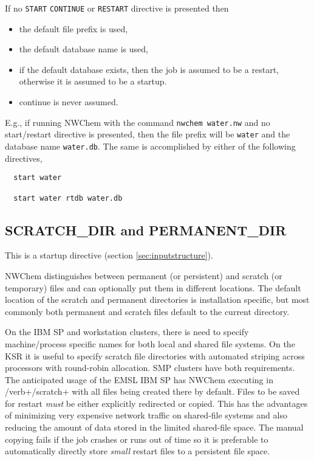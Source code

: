 If no \verb+START+ \verb+CONTINUE+ or \verb+RESTART+ directive is
presented then 
\begin{itemize}
  \item the default file prefix is used,
  \item the default database name is used,
  \item if the default database exists, then the job is assumed to be
    a restart, otherwise it is assumed to be a startup.
  \item continue is never assumed.
\end{itemize}

E.g., if running NWChem with the command \verb+nwchem water.nw+ and no
start/restart directive is presented, then the file prefix will be
\verb+water+ and the database name \verb+water.db+.  The same is
accomplished by either of the following directives,
\begin{verbatim}
  start water

  start water rtdb water.db
\end{verbatim}

\subsection{SCRATCH\_DIR and PERMANENT\_DIR}
\label{sec:dirs}

This is a startup directive (section \ref{sec:inputstructure}).

NWChem distinguishes between permanent (or persistent) and scratch (or
temporary) files and can optionally put them in different locations.
The default location of the scratch and permanent directories is
installation specific, but most commonly both permanent and scratch
files default to the current directory.

On the IBM SP and workstation clusters, there is need to specify
machine/process specific names for both local and shared file systems.
On the KSR it is useful to specify scratch file directories with
automated striping across processors with round-robin allocation.  SMP
clusters have both requirements.  The anticipated usage of the EMSL
IBM SP has NWChem executing in /verb+/scratch+ with all files
being created there by default.  Files to be saved for restart {\em
  must} be either explicitly redirected or copied.  This has the
advantages of minimizing very expensive network traffic on shared-file
systems and also reducing the amount of data stored in the limited
shared-file space.  The manual copying fails if the job crashes or
runs out of time so it is preferable to automatically directly store
{\em small} restart files to a persistent file space.

